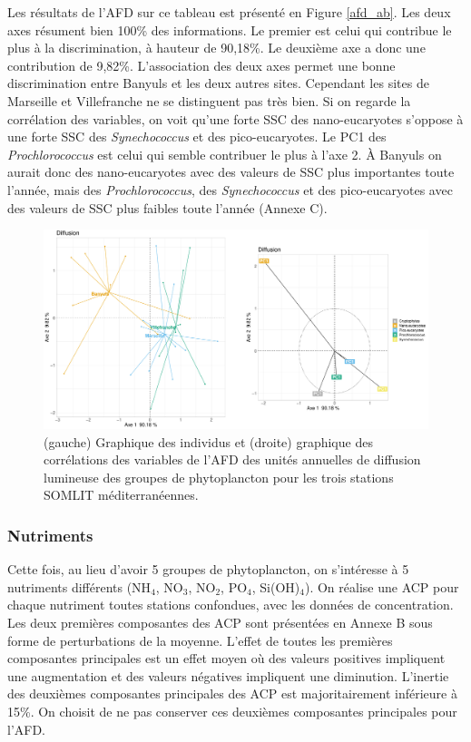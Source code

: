 \documentclass[12pt]{article}
\begin{document}
Les résultats de l’AFD sur ce tableau est présenté en Figure \ref{afd_ab}. Les deux axes résument bien 100\% des informations. Le premier est celui qui contribue le plus à la discrimination, à hauteur de 90,18\%. Le deuxième axe a donc une contribution de 9,82\%. L’association des deux axes permet une bonne discrimination entre Banyuls et les deux autres sites. Cependant les sites de Marseille et Villefranche ne se distinguent pas très bien. Si on regarde la corrélation des variables, on voit qu’une forte SSC des nano-eucaryotes s’oppose à une forte SSC des \textit{Synechococcus} et des pico-eucaryotes. Le PC1 des \textit{Prochlorococcus} est celui qui semble contribuer le plus à l’axe 2. À Banyuls on aurait donc des nano-eucaryotes avec des valeurs de SSC plus importantes toute l’année, mais des \textit{Prochlorococcus}, des \textit{Synechococcus} et des pico-eucaryotes avec des valeurs de SSC plus faibles toute l’année (Annexe C). 



\begin{figure}
\centering
\includegraphics[width=.95\textwidth]{fig/R224_FDA_diff.pdf}
\caption{(gauche) Graphique des individus et (droite) graphique des corrélations des variables de l'AFD des unités annuelles de diffusion lumineuse des groupes de phytoplancton pour les trois stations SOMLIT méditerranéennes.}
\label{afd_diff}
\end{figure}

\subsubsection{Nutriments}

Cette fois, au lieu d’avoir 5 groupes de phytoplancton, on s’intéresse à 5 nutriments différents (NH$_4$, NO$_3$, NO$_2$, PO$_4$, Si(OH)$_4$). On réalise une ACP pour chaque nutriment toutes stations confondues, avec les données de concentration. Les deux premières composantes des ACP sont présentées en Annexe B sous forme de perturbations de la moyenne. L’effet de toutes les premières composantes principales est un effet moyen où des valeurs positives impliquent une augmentation et des valeurs négatives impliquent une diminution. L’inertie des deuxièmes composantes principales des ACP est majoritairement inférieure à 15\%. On choisit de ne pas conserver ces deuxièmes composantes principales pour l’AFD.
\end{document}
